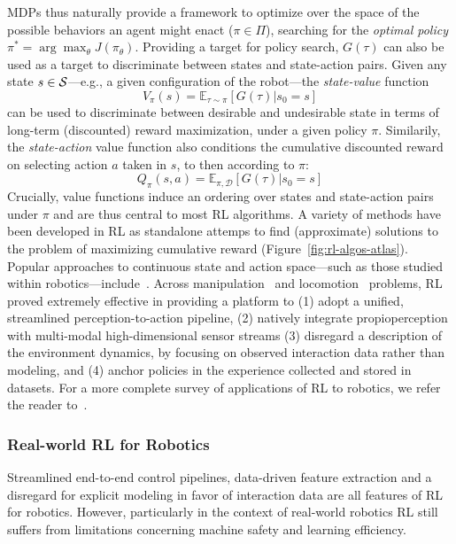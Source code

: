 MDPs thus naturally provide a framework to optimize over the space of the possible behaviors an agent might enact (\( \pi \in \Pi \)), searching for the \emph{optimal policy} \( \pi^* = \arg \max_{\theta} J(\pi_\theta) \).
Providing a target for policy search, \( G(\tau) \) can also be used as a target to discriminate between states and state-action pairs.
Given any state \( s \in \mathcal S \)---e.g., a given configuration of the robot---the \emph{state-value} function
\[
    V_\pi(s) = \mathbb E_{\tau \sim \pi} \left[ G(\tau) \big \vert s_0 = s \right]
\]
can be used to discriminate between desirable and undesirable state in terms of long-term (discounted) reward maximization, under a given policy \(\pi\).
Similarily, the \emph{state-action} value function also conditions the cumulative discounted reward on selecting action \( a \) taken in \( s \), to then according to \( \pi \):
\[
    Q_\pi(s,a) = \mathbb E_{\pi, \mathcal D} \left[ G (\tau) \big \vert s_0 = s \right]
\]
Crucially, value functions induce an ordering over states and state-action pairs under \( \pi \) and are thus central to most RL algorithms.
A variety of methods have been developed in RL as standalone attemps to find (approximate) solutions to the problem of maximizing cumulative reward (Figure~\ref{fig:rl-algos-atlas}).
Popular approaches to continuous state and action space---such as those studied within robotics---include~\citet{schulmanTrustRegionPolicy2017, schulmanProximalPolicyOptimization2017, haarnojaSoftActorCriticOffPolicy2018}.
Across manipulation~\citep{akkayaSolvingRubiksCube2019} and locomotion~\citep{leeLearningQuadrupedalLocomotion2020} problems, RL proved extremely effective in providing a platform to (1) adopt a unified, streamlined perception-to-action pipeline, (2) natively integrate propioperception with multi-modal high-dimensional sensor streams  (3) disregard a description of the environment dynamics, by focusing on observed interaction data rather than modeling, and (4) anchor policies in the experience collected and stored in datasets.
For a more complete survey of applications of RL to robotics, we refer the reader to~\citet{koberReinforcementLearningRobotics,tangDeepReinforcementLearning2024}.

\subsubsection{Real-world RL for Robotics}
Streamlined end-to-end control pipelines, data-driven feature extraction and a disregard for explicit modeling in favor of interaction data are all features of RL for robotics.
However, particularly in the context of real-world robotics RL still suffers from limitations concerning machine safety and learning efficiency.

